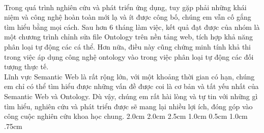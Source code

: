 \documentclass[a4paper, 12pt, oneside]{Thesis}  %
\begin{document}
{\\
Trong quá trình nghiên cứu và phát triển ứng dụng, tuy gặp phải những khái niệm và công nghệ hoàn toàn mới lạ và ít được công bố, chúng em vẫn cố gắng tìm hiểu bằng mọi cách. Sau hơn 6 tháng làm việc, kết quả đạt được của nhóm là một chương trình chỉnh sửa file Ontology trên nền tảng web, tích hợp khả năng phân loại tự động các cá thể. Hơn nữa, điều này cũng chứng minh tính khả thi trong việc áp dụng công nghệ ontology vào trong việc phân loại tự động các đối tượng thực tế.
\\
Lĩnh vực Semantic Web là rất rộng lớn, với một khoảng thời gian có hạn, chúng em chỉ có thể tìm hiểu được những vấn đề được coi là cơ bản và tất yếu nhất của Semantic Web và Ontology. Dù vậy, chúng em rất hài lòng và tự tin với những gì tìm hiểu, nghiên cứu và phát triển được sẽ mang lại nhiều lợi ích, đóng góp vào công cuộc nghiên cứu khoa học chung.	
}
\clearpage  %
\setmarginsrb           { 3.5cm}  %
						{ 2.0cm}  %
						{ 2.0cm}  %
						{ 2.5cm}  %
						{ 1.0cm}  %
						{ 0.5cm}  %
						{ 1.0cm}  %
						{ .75cm}  %
\mainmatter	  %
\pagestyle{fancy}  %
\lhead{}
\cfoot{\thepage}






%






\clearpage
\appendix %
\backmatter
\label{Bibliography}
\end{document}
